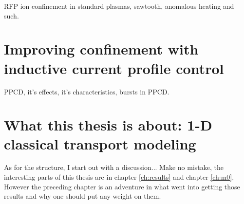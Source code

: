 \begin{refsection}
RFP ion confinement in standard plasmas, sawtooth, anomalous heating and such.

\section{Improving confinement with inductive current profile control}

PPCD, it's effects, it's characteristics, bursts in PPCD.

\section{What this thesis is about: 1-D classical transport modeling}


As for the structure, I start out with a discussion...
Make no mistake, the interesting parts of this thesis are in chapter \ref{ch:results} and chapter \ref{ch:m0}. However the preceding chapter is an adventure in what went into getting those results and why one should put any weight on them.





\end{refsection}